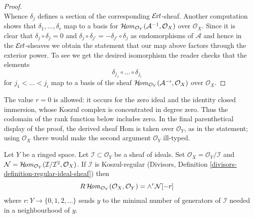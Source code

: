 \begin{proof}
$$$$
Whence $\delta_j$ defines a section of the corresponding
$\mathop{\mathcal{E}\!\mathit{xt}}\nolimits$-sheaf.
Another computation shows that $\delta_1, \ldots, \delta_r$
map to a basis for $\mathop{\mathcal{H}\!\mathit{om}}\nolimits_{\mathcal{O}_Y}(\mathcal{A}^{-1}, \mathcal{O}_X)$
over $\mathcal{O}_X$.
Since it is clear that $\delta_j \circ \delta_j = 0$
and $\delta_j \circ \delta_{j'} = - \delta_{j'} \circ \delta_j$
as endomorphisms of $\mathcal{A}$ and hence in the
$\mathop{\mathcal{E}\!\mathit{xt}}\nolimits$-sheaves
we obtain the statement that our map above factors through
the exterior power. To see we get the desired isomorphism
the reader checks that the elements
$$
\delta_{j_1} \circ \ldots \circ \delta_{j_i}
$$
for $j_1 < \ldots < j_i$ map to a basis of the sheaf
$\mathop{\mathcal{H}\!\mathit{om}}\nolimits_{\mathcal{O}_Y}(\mathcal{A}^{-i}, \mathcal{O}_X)$
over $\mathcal{O}_X$.
\end{proof}

\begin{lemma}
\label{lemma-regular-immersion-ext}
\begin{history}
The value $r=0$ is allowed: it occurs for the zero ideal and the identity
closed immersion, whose Koszul complex is concentrated in degree zero.
Thus the codomain of the rank function below includes zero. In the final
parenthetical display of the proof, the derived sheaf Hom is taken over
$\mathcal O_Y$, as in the statement; using $\mathcal O_X$ there would make
the second argument $\mathcal O_Y$ ill-typed.
\end{history}
Let $Y$ be a ringed space. Let $\mathcal{I} \subset \mathcal{O}_Y$
be a sheaf of ideals. Set $\mathcal{O}_X = \mathcal{O}_Y/\mathcal{I}$ and
$\mathcal{N} =
\mathop{\mathcal{H}\!\mathit{om}}\nolimits_{\mathcal{O}_Y}(\mathcal{I}/\mathcal{I}^2, \mathcal{O}_X)$.
If $\mathcal{I}$ is Koszul-regular
(Divisors, Definition \ref{divisors-definition-regular-ideal-sheaf}) then
$$
R\mathop{\mathcal{H}\!\mathit{om}}\nolimits_{\mathcal{O}_Y}(\mathcal{O}_X, \mathcal{O}_Y) =
\wedge^r \mathcal{N}[-r]
$$
where $r : Y \to \{0, 1, 2, \ldots \}$ sends $y$ to
the minimal number of generators of $\mathcal{I}$ needed in a neighbourhood
of $y$.
\end{lemma}


